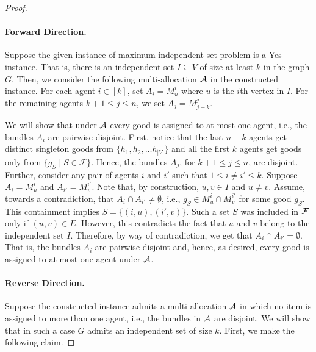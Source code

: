 \begin{proof}
\paragraph{Forward Direction.} Suppose the given instance of maximum independent set problem is a {\rm Yes} instance. That is, there is an independent set $I \subseteq V$ of size at least $k$ in the graph $G$. Then, we consider the following multi-allocation $\mathcal{A}$ in the constructed instance. For each agent $i \in [k]$, set $A_i = M^i_u$ where $u$ is the $i$th vertex in $I$. For the remaining agents $k+1 \leq j \leq n$, we set $A_j = M^j_{j-k}$.
    
We will show that under $\mathcal{A}$ every good is assigned to at most one agent, i.e., the bundles $A_i$ are pairwise disjoint. First, notice that the last $n-k$ agents get distinct singleton goods from $\{h_1, h_2, \ldots h_{|V|}\}$ and all the first $k$ agents get goods only from $\{g_S \mid S \in \mathcal{F}\}$. Hence, the bundles $A_j$, for $k+1 \leq j \leq n$, are disjoint. Further, consider any pair of agents $i$ and $i'$ such that $1 \leq i \neq i' \leq k$. Suppose $A_i = M^i_u$ and $A_{i'} = M^{i'}_v$. Note that, by construction, $u, v \in I$ and $u \neq v$. Assume, towards a contradiction, that $A_i \cap A_{i'} \neq \emptyset$, i.e., $g_S \in M^i_u \cap M^{i'}_v$ for some good $g_S$. This containment implies $S = \{(i, u), (i', v)\}$. Such a set $S$ was included in $\mathcal{F}$ only if $(u, v) \in E$. However, this contradicts the fact that $u$ and $v$ belong to the independent set $I$. Therefore, by way of contradiction, we get that $A_i \cap A_{i'} = \emptyset$. That is, the bundles $A_i$ are pairwise disjoint and, hence, as desired, every good is assigned to at most one agent under $\mathcal{A}$. 

\paragraph{Reverse Direction.} Suppose the constructed instance admits a multi-allocation $\mathcal{A}$ in which no item is assigned to more than one agent, i.e., the bundles in $\mathcal{A}$ are disjoint. We will show that in such a case $G$ admits an independent set of size $k$. First, we make the following claim.


\end{proof}
